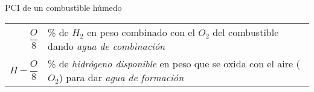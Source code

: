 \documentclass[11pt,a4paper]{article}
\begin{document}
\begin{multicols}{2}
\begin{cajita}
			\begin{flushleft}
				PCI de un combustible húmedo
			\end{flushleft}
			
			\vspace{-.2cm}
			
			\vspace{.2cm}
			
			\begin{tabular}{r p{.7\linewidth}}
				$\dfrac{O}{8}$ & \% de $H_2$ en peso combinado con el $O_2$ del combustible dando \emph{agua de combinación}\\
				$H - \dfrac{O}{8}$ & \% de \emph{hidrógeno disponible} en peso que se oxida con el aire ($O_2$) para dar \emph{agua de formación}
			\end{tabular}
		\end{cajita}
	\end{multicols}
	
\end{document}
